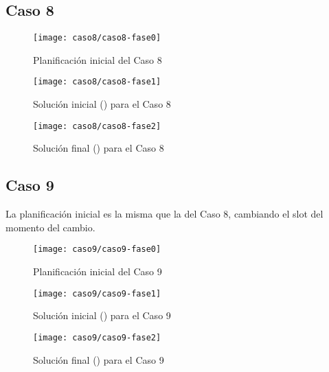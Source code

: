 \FloatBarrier
\newpage
\subsection{Caso 8}

\begin{figure}[!h]
	\centering
	\texttt{[image: caso8/caso8-fase0]}
	\caption{Planificación inicial del Caso 8}
	\label{fig:caso8-fase0}
\end{figure}

\begin{figure}[!h]
	\centering
	\texttt{[image: caso8/caso8-fase1]}
	\caption{Solución inicial (\faseuno{}) para el Caso 8}
	\label{fig:caso8-fase1}
\end{figure}

\begin{figure}[!h]
	\centering
	\texttt{[image: caso8/caso8-fase2]}
	\caption{Solución final (\fasedos{}) para el Caso 8}
	\label{fig:caso8-fase2}
\end{figure}

\FloatBarrier
\newpage
\subsection{Caso 9}

La planificación inicial es la misma que la del Caso 8, cambiando el slot del momento del cambio.

\begin{figure}[!h]
	\centering
	\texttt{[image: caso9/caso9-fase0]}
	\caption{Planificación inicial del Caso 9}
	\label{fig:caso9-fase0}
\end{figure}

\begin{figure}[!h]
	\centering
	\texttt{[image: caso9/caso9-fase1]}
	\caption{Solución inicial (\faseuno{}) para el Caso 9}
	\label{fig:caso9-fase1}
\end{figure}

\begin{figure}[!h]
	\centering
	\texttt{[image: caso9/caso9-fase2]}
	\caption{Solución final (\fasedos{}) para el Caso 9}
	\label{fig:caso9-fase2}
\end{figure}
